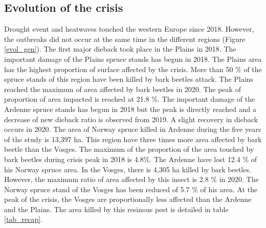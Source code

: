 \documentclass[3p,procedia]{elsarticle}
\begin{document}
\subsection{Evolution of the crisis}

Drought event and heatwaves touched the western Europe since 2018.
However, the outbreaks did not occur at the same time in the different regions (Figure \ref{evol_gen}).
The first major dieback took place in the Plains in 2018. 
The important damage of the Plains spruce stands has begun in 2018.  
The Plains area has the highest proportion of surface affected by the crisis.
More than 50 \% of the spruce stands of this region have been killed by bark beetles attack.
The Plains reached the maximum of area affected by bark beetles in 2020. 
The peak of proportion of area impacted is reached at 21.8 \%.
The important damage of the Ardenne spruce stands has begun in 2018 but the peak is directly reached and a decrease of new dieback ratio is observed from 2019. 
A slight recovery in dieback occurs in 2020.
The area of Norway spruce killed in Ardenne during the five years of the study is 13,397 ha.
This region have three times more area affected by bark beetle than the Vosges.
The maximum of the proportion of the area touched by bark beetles during crisis peak in 2018 is 4.8\%. 
The Ardenne have lost 12.4 \% of his Norway spruce area.
In the Vosges, there is 4,305 ha killed by bark beetles.
However, the maximum ratio of area affected by this insect is 2.8 \% in 2020.
The Norway spruce stand of the Vosges has been reduced of 5.7 \% of his area. 
At the peak of the crisis, the Vosges are proportionally less affected than the Ardenne and the Plains.
The area killed by this resinous pest is detailed in table \ref{tab_recap}.
\end{document}
